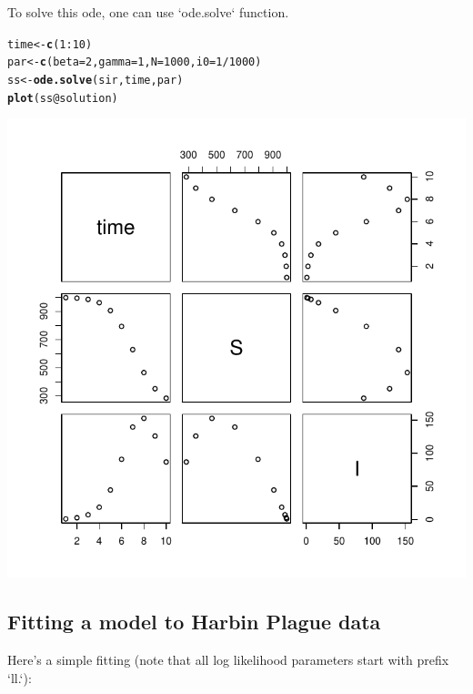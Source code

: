 \documentclass{article}\usepackage[]{graphicx}\usepackage[]{color}
\makeatletter
\def\maxwidth{ %
  \ifdim\Gin@nat@width>\linewidth
    \linewidth
  \else
    \Gin@nat@width
  \fi
}
\newcommand{\hlnum}[1]{\textcolor[rgb]{0.686,0.059,0.569}{#1}}%
\newcommand{\hlopt}[1]{\textcolor[rgb]{0,0,0}{#1}}%
\newcommand{\hlstd}[1]{\textcolor[rgb]{0.345,0.345,0.345}{#1}}%
\newcommand{\hlkwb}[1]{\textcolor[rgb]{0.69,0.353,0.396}{#1}}%
\newcommand{\hlkwc}[1]{\textcolor[rgb]{0.333,0.667,0.333}{#1}}%
\newcommand{\hlkwd}[1]{\textcolor[rgb]{0.737,0.353,0.396}{\textbf{#1}}}%
\newenvironment{kframe}{%
 \def\at@end@of@kframe{}%
 \ifinner\ifhmode%
  \def\at@end@of@kframe{\end{minipage}}%
  \begin{minipage}{\columnwidth}%
 \fi\fi%
 \def\FrameCommand##1{\hskip\@totalleftmargin \hskip-\fboxsep
 \colorbox{shadecolor}{##1}\hskip-\fboxsep
     \hskip-\linewidth \hskip-\@totalleftmargin \hskip\columnwidth}%
 \MakeFramed {\advance\hsize-\width
   \@totalleftmargin\z@ \linewidth\hsize
   \@setminipage}}%
 {\par\unskip\endMakeFramed%
 \at@end@of@kframe}
\newenvironment{knitrout}{}{} %
\makeatother
\begin{document}
To solve this ode, one can use `ode.solve` function.

\begin{knitrout}
\color{fgcolor}\begin{kframe}
\begin{alltt}
\hlstd{time} \hlkwb{<-} \hlkwd{c}\hlstd{(}\hlnum{1}\hlopt{:}\hlnum{10}\hlstd{)}
\hlstd{par} \hlkwb{<-} \hlkwd{c}\hlstd{(}\hlkwc{beta}\hlstd{=}\hlnum{2}\hlstd{,} \hlkwc{gamma}\hlstd{=}\hlnum{1}\hlstd{,} \hlkwc{N}\hlstd{=}\hlnum{1000}\hlstd{,} \hlkwc{i0}\hlstd{=}\hlnum{1}\hlopt{/}\hlnum{1000}\hlstd{)}
\hlstd{ss} \hlkwb{<-} \hlkwd{ode.solve}\hlstd{(sir, time, par)}
\hlkwd{plot}\hlstd{(ss}\hlopt{@}\hlkwc{solution}\hlstd{)}
\end{alltt}
\end{kframe}
\includegraphics[width=\maxwidth]{figure/sir_model_solve-1} 

\end{knitrout}

\subsection{Fitting a model to Harbin Plague data}

Here's a simple fitting (note that all log likelihood parameters start with prefix `ll.`):
\end{document}
